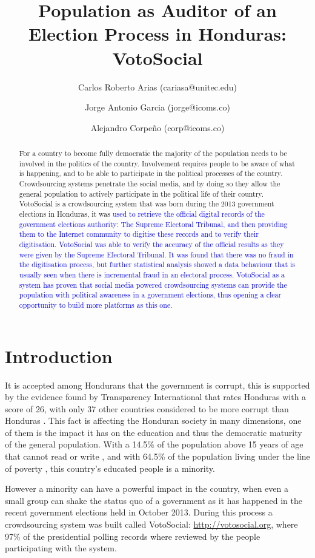 \documentclass[letterpaper,10pt]{article}
\title{Population as Auditor of an Election Process in Honduras: VotoSocial}
\author[1,2]{Carlos Roberto Arias (cariasa@unitec.edu)}
\author[1,3]{Jorge Antonio Garcia (jorge@icoms.co)}
\author[3]{Alejandro Corpeño (corp@icoms.co)}
\affil[1]{Facultad de Ingenier\'{i}a, UNITEC, Tegucigalpa, Honduras}
\affil[2]{Instituto de Investigaci\'{o}n de Pol\'{i}ticas P\'{u}blicas, UNITEC, Tegucigalpa, Honduras}
\affil[3]{Icoms Technologies S de RL, Tegucigalpa, Honduras}
\begin{document}

\begin{abstract}
For a country to become fully democratic the majority of the population needs to be involved in the politics of the country. Involvement requires people to be aware of what is happening, and to be able to participate in the political processes of the country. Crowdsourcing systems penetrate the social media, and by doing so they allow the general population to actively participate in the political life of their country. VotoSocial is a crowdsourcing system that was born during the 2013 government elections in Honduras, it was \textcolor{blue}{used to retrieve the official digital records of the government elections authority: The Supreme Electoral Tribunal, and then providing them to the Internet community to digitise these records and to verify their digitisation. VotoSocial was able to verify the accuracy of the official results as they were given by the Supreme Electoral Tribunal. It was found that there was no fraud in the digitisation process, but further statistical analysis showed a data behaviour that is usually seen when there is incremental fraud in an electoral process. VotoSocial as a system has proven that social media powered crowdsourcing systems can provide the population with political awareness in a government elections, thus opening a clear opportunity to build more platforms as this one.}
\end{abstract}

\section{Introduction}
It is accepted among Hondurans that the government is corrupt, this is supported by the evidence found by Transparency International that rates Honduras with a score of 26, with only 37 other countries considered to be more corrupt than Honduras \citep{transp}. This fact is affecting the Honduran society in many dimensions, one of them is the impact it has on the education and thus the democratic maturity of the general population. With a 14.5\% of the population above 15 years of age that cannot read or write \citep{bchrep}, and with 64.5\% of the population living under the line of poverty \citep{wbdata}, this country's educated people is a minority.


However a minority can have a powerful impact in the country, when even a small group can shake the status quo of a government \citep{saadia2014} as it has happened in the recent government elections held in October 2013. During this process a crowdsourcing system was built called VotoSocial: \url{http://votosocial.org}, where 97\% of the presidential polling records where reviewed by the people participating with the system.
\end{document}
